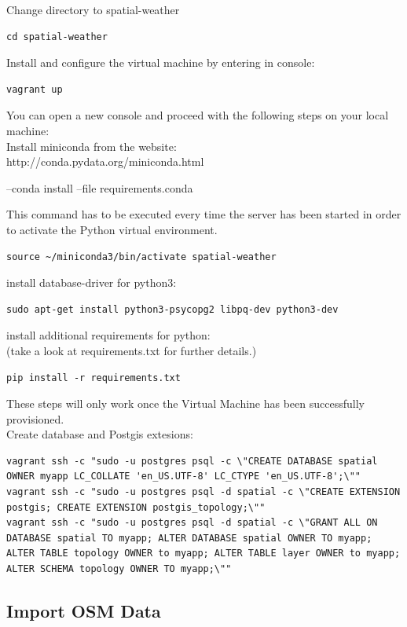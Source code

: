 \documentclass[paper=a4, fontsize=11pt]{scrartcl} %
\numberwithin{equation}{section} %
\numberwithin{figure}{section} %
\numberwithin{table}{section} %
\begin{document}
Change directory to spatial-weather
\begin{lstlisting}
cd spatial-weather
\end{lstlisting}

Install and configure the virtual machine by entering in console:
\begin{lstlisting}
vagrant up
\end{lstlisting}

You can open a new console and proceed with the following steps on your local machine:\\
Install miniconda from the website:\\
http://conda.pydata.org/miniconda.html

--conda install --file requirements.conda

This command has to be executed every time the server has been started in order to activate the Python virtual environment.
\begin{lstlisting}
source ~/miniconda3/bin/activate spatial-weather
\end{lstlisting}

install database-driver for python3:
\begin{lstlisting}
sudo apt-get install python3-psycopg2 libpq-dev python3-dev
\end{lstlisting}

install additional requirements for python:\\
(take a look at requirements.txt for further details.)
\begin{lstlisting}
pip install -r requirements.txt
\end{lstlisting}

These steps will only work once the Virtual Machine has been successfully provisioned.\\
Create database and Postgis extesions:
\begin{lstlisting}[breaklines=true]
vagrant ssh -c "sudo -u postgres psql -c \"CREATE DATABASE spatial OWNER myapp LC_COLLATE 'en_US.UTF-8' LC_CTYPE 'en_US.UTF-8';\"" 
vagrant ssh -c "sudo -u postgres psql -d spatial -c \"CREATE EXTENSION postgis; CREATE EXTENSION postgis_topology;\"" 
vagrant ssh -c "sudo -u postgres psql -d spatial -c \"GRANT ALL ON DATABASE spatial TO myapp; ALTER DATABASE spatial OWNER TO myapp; ALTER TABLE topology OWNER to myapp; ALTER TABLE layer OWNER to myapp; ALTER SCHEMA topology OWNER TO myapp;\""
\end{lstlisting}

\subsection{Import OSM Data}\label{import-osm-data}
\end{document}
